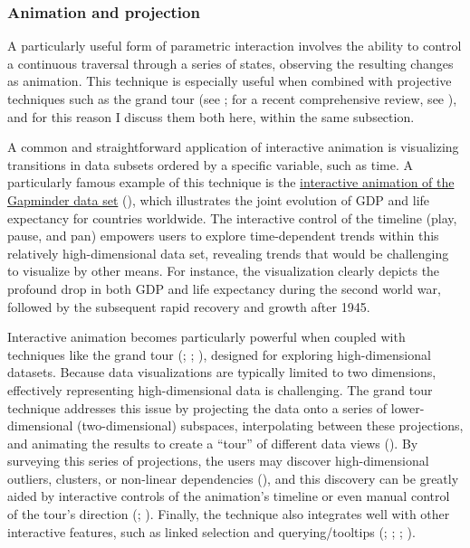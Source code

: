 \documentclass[
  openany]{book}
\theoremstyle{definition}
\theoremstyle{definition}
\theoremstyle{definition}
\theoremstyle{definition}
\theoremstyle{remark}
\begin{document}
\subsubsection{Animation and projection}\label{animation-and-projection}

A particularly useful form of parametric interaction involves the ability to control a continuous traversal through a series of states, observing the resulting changes as animation. This technique is especially useful when combined with projective techniques such as the grand tour (see ; for a recent comprehensive review, see ), and for this reason I discuss them both here, within the same subsection.

A common and straightforward application of interactive animation is visualizing transitions in data subsets ordered by a specific variable, such as time. A particularly famous example of this technique is the \href{https://www.gapminder.org/tools/\#$chart-type=bubbles&url=v2}{interactive animation of the Gapminder data set} (), which illustrates the joint evolution of GDP and life expectancy for countries worldwide. The interactive control of the timeline (play, pause, and pan) empowers users to explore time-dependent trends within this relatively high-dimensional data set, revealing trends that would be challenging to visualize by other means. For instance, the visualization clearly depicts the profound drop in both GDP and life expectancy during the second world war, followed by the subsequent rapid recovery and growth after 1945.

Interactive animation becomes particularly powerful when coupled with techniques like the grand tour (; ; ), designed for exploring high-dimensional datasets. Because data visualizations are typically limited to two dimensions, effectively representing high-dimensional data is challenging. The grand tour technique addresses this issue by projecting the data onto a series of lower-dimensional (two-dimensional) subspaces, interpolating between these projections, and animating the results to create a ``tour'' of different data views (). By surveying this series of projections, the users may discover high-dimensional outliers, clusters, or non-linear dependencies (), and this discovery can be greatly aided by interactive controls of the animation's timeline or even manual control of the tour's direction (; ). Finally, the technique also integrates well with other interactive features, such as linked selection and querying/tooltips (; ; ; ).
\end{document}
